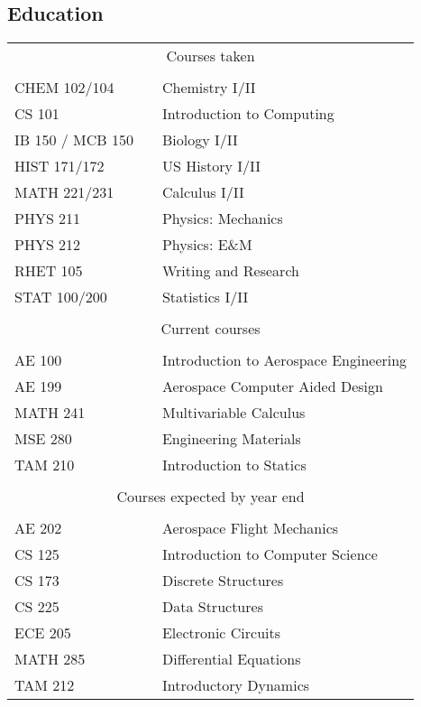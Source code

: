 \documentclass[margin]{res}
\begin{document}
\begin{resume}
\section{Education}
  \begin{tabular}{l p{1in} l}
    \\
    \multicolumn{3}{c}{Courses taken} \\
    \\
    CHEM 102/104 & \hfill & Chemistry I/II \\
    CS 101 & \hfill & Introduction to Computing \\
    IB 150 / MCB 150 & \hfill & Biology I/II \\
    HIST 171/172 & \hfill & US History I/II \\
    MATH 221/231 & \hfill & Calculus I/II \\
    PHYS 211 & \hfill & Physics: Mechanics \\
    PHYS 212 & \hfill & Physics: E\&M \\
    RHET 105 & \hfill & Writing and Research \\
    STAT 100/200 & \hfill & Statistics I/II \\
    \\
    \multicolumn{3}{c}{Current courses} \\
    \\
    AE 100 & \hfill & Introduction to Aerospace Engineering \\
    AE 199 & \hfill & Aerospace Computer Aided Design \\
    MATH 241 & \hfill & Multivariable Calculus \\
    MSE 280 & \hfill & Engineering Materials \\
    TAM 210 & \hfill & Introduction to Statics \\
    \\
    \multicolumn{3}{c}{Courses expected by year end} \\
    \\
    AE 202 & \hfill & Aerospace Flight Mechanics \\
    CS 125 & \hfill & Introduction to Computer Science \\
    CS 173 & \hfill & Discrete Structures \\
    CS 225 & \hfill & Data Structures \\
    ECE 205 & \hfill & Electronic Circuits \\
    MATH 285 & \hfill & Differential Equations \\
    TAM 212 & \hfill & Introductory Dynamics \\
  \end{tabular}


\end{resume}
\end{document}
